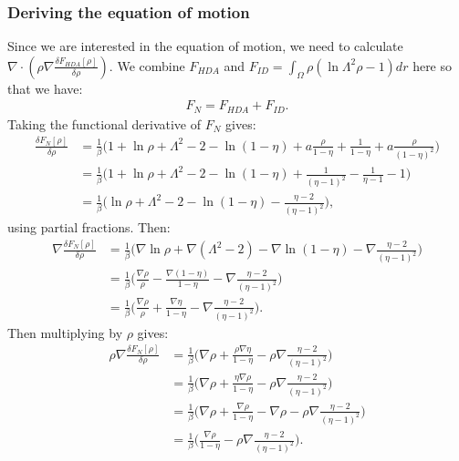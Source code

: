 \subsubsection{Deriving the equation of motion}
Since we are interested in the equation of motion, we need to calculate $ \nabla \cdot \left(\rho \nabla \frac{\delta F_{HDA}[\rho]}{\delta \rho} \right)$. We combine $F_{HDA}$ and $F_{ID} = \int_\Omega \rho (\ln \Lambda^2 \rho - 1) dr$ here so that we have:
\begin{align*}
	F_{N} = F_{HDA} + F_{ID}.
\end{align*}
Taking the functional derivative of $F_{N}$ gives:
\begin{align*}
	\frac{\delta F_{N}[\rho]}{\delta \rho} &= \frac{1}{\beta} \bigg(1 + \ln \rho + \Lambda^2 -2 - \ln(1-\eta) + a \frac{\rho}{1 - \eta} + \frac{1}{1 - \eta} + a \frac{\rho}{(1 - \eta)^2}  \bigg)\\
	&= \frac{1}{\beta} \bigg(1 + \ln \rho + \Lambda^2 -2 - \ln(1-\eta) + \frac{1}{(\eta - 1)^2} - \frac{1}{\eta - 1}  - 1\bigg)\\
	&= \frac{1}{\beta} \bigg( \ln \rho + \Lambda^2 - 2 - \ln(1-\eta) - \frac{\eta - 2}{(\eta - 1)^2}  \bigg),
\end{align*}
using partial fractions. Then:
\begin{align*}
	\nabla \frac{\delta F_{N}[\rho]}{\delta \rho} &= \frac{1}{\beta} \bigg( \nabla\ln \rho + \nabla(\Lambda^2 - 2) - \nabla\ln(1-\eta) - \nabla\frac{\eta - 2}{(\eta - 1)^2}  \bigg)\\
	& = \frac{1}{\beta} \bigg( \frac{\nabla \rho}{\rho} - \frac{\nabla( 1- \eta)}{1 - \eta} - \nabla\frac{\eta - 2}{(\eta - 1)^2}  \bigg)\\
	& = \frac{1}{\beta} \bigg( \frac{\nabla \rho}{\rho} + \frac{\nabla \eta}{1 - \eta} - \nabla\frac{\eta - 2}{(\eta - 1)^2}  \bigg).
\end{align*}
Then multiplying by $\rho$ gives:
\begin{align*}
	\rho \nabla \frac{\delta F_{N}[\rho]}{\delta \rho} &= \frac{1}{\beta} \bigg( \nabla \rho +   \frac{\rho \nabla \eta}{1 - \eta} - \rho \nabla\frac{\eta - 2}{(\eta - 1)^2}  \bigg)\\
	&= \frac{1}{\beta} \bigg( \nabla \rho +   \frac{\eta\nabla \rho}{1 - \eta} - \rho \nabla\frac{\eta - 2}{(\eta - 1)^2}  \bigg)\\
	&= \frac{1}{\beta} \bigg( \nabla \rho + \frac{\nabla \rho}{1 - \eta} - \nabla \rho - \rho \nabla\frac{\eta - 2}{(\eta - 1)^2}  \bigg)\\
	&= \frac{1}{\beta} \bigg(  \frac{\nabla \rho}{1 - \eta}  - \rho \nabla\frac{\eta - 2}{(\eta - 1)^2}  \bigg).
\end{align*}

